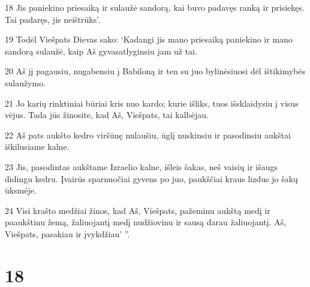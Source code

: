 \par 18 Jis paniekino priesaiką ir sulaužė sandorą, kai buvo padavęs ranką ir prisiekęs. Tai padaręs, jis neištrūks’. 
\par 19 Todėl Viešpats Dievas sako: ‘Kadangi jis mano priesaiką paniekino ir mano sandorą sulaužė, kaip Aš gyvas­atlyginsiu jam už tai. 
\par 20 Aš jį pagausiu, nugabensiu į Babiloną ir ten su juo bylinėsiuosi dėl ištikimybės sulaužymo. 
\par 21 Jo karių rinktiniai būriai kris nuo kardo; kurie išliks, tuos išsklaidysiu į visus vėjus. Tada jūs žinosite, kad Aš, Viešpats, tai kalbėjau. 
\par 22 Aš pats aukšto kedro viršūnę nulaušiu, ūglį nuskinsiu ir pasodinsiu aukštai iškilusiame kalne. 
\par 23 Jis, pasodintas aukštame Izraelio kalne, išleis šakas, neš vaisių ir išaugs didingu kedru. Įvairūs sparnuočiai gyvens po juo, paukščiai kraus lizdus jo šakų ūksmėje. 
\par 24 Visi krašto medžiai žinos, kad Aš, Viešpats, pažeminu aukštą medį ir paaukštinu žemą, žaliuojantį medį nudžiovinu ir sausą darau žaliuojantį. Aš, Viešpats, pasakiau ir įvykdžiau’ ”.



\chapter{18}


